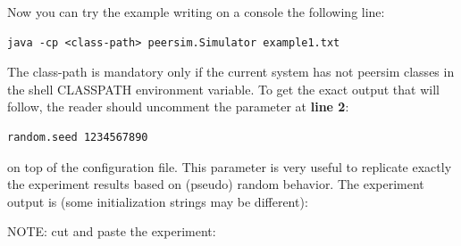\documentclass[a4paper,11pt]{article}
\begin{document}
Now you can try the example writing on a console the following line:

\begin{verbatim}
java -cp <class-path> peersim.Simulator example1.txt
\end{verbatim}

The class-path is mandatory only if the current system has not peersim
classes in the shell CLASSPATH environment variable. To get the exact
output that will follow, the reader should uncomment the parameter
at \textbf{line 2}:

\begin{verbatim}
random.seed 1234567890
\end{verbatim}

on top of the configuration file. This parameter is very useful to
replicate exactly the experiment results based on (pseudo) random
behavior. The experiment output is (some initialization strings may
be different):

NOTE: cut and paste the experiment: 
\end{document}
